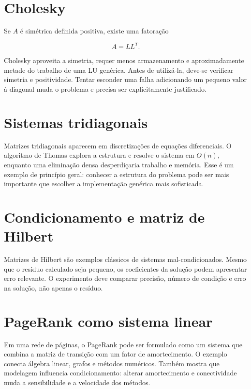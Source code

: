\documentclass[12pt,a4paper,openany]{book}
\begin{document}
\section{Cholesky}



Se $A$ é simétrica definida positiva, existe uma fatoração



\[A=LL^T.\]



Cholesky aproveita a simetria, requer menos armazenamento e aproximadamente metade do trabalho de uma LU genérica. Antes de utilizá-la, deve-se verificar simetria e positividade. Tentar esconder uma falha adicionando um pequeno valor à diagonal muda o problema e precisa ser explicitamente justificado.



\section{Sistemas tridiagonais}



Matrizes tridiagonais aparecem em discretizações de equações diferenciais. O algoritmo de Thomas explora a estrutura e resolve o sistema em $O(n)$, enquanto uma eliminação densa desperdiçaria trabalho e memória. Esse é um exemplo de princípio geral: conhecer a estrutura do problema pode ser mais importante que escolher a implementação genérica mais sofisticada.



\section{Condicionamento e matriz de Hilbert}



Matrizes de Hilbert são exemplos clássicos de sistemas mal-condicionados. Mesmo que o resíduo calculado seja pequeno, os coeficientes da solução podem apresentar erro relevante. O experimento deve comparar precisão, número de condição e erro na solução, não apenas o resíduo.



\section{PageRank como sistema linear}



Em uma rede de páginas, o PageRank pode ser formulado como um sistema que combina a matriz de transição com um fator de amortecimento. O exemplo conecta álgebra linear, grafos e métodos numéricos. Também mostra que modelagem influencia condicionamento: alterar amortecimento e conectividade muda a sensibilidade e a velocidade dos métodos.
\end{document}
